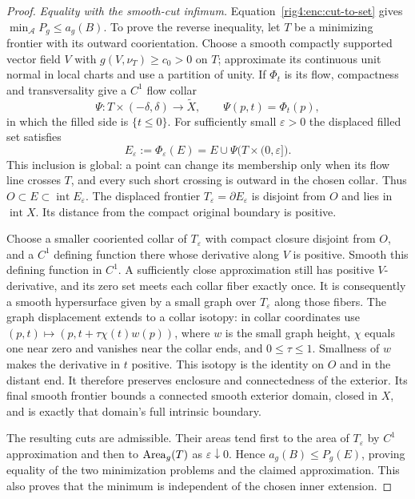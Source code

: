 \begin{proof}
\emph{Equality with the smooth-cut infimum.}
Equation~\eqref{rig4:enc:cut-to-set} gives
$\min_{\mathcal A}P_g\le a_g(B)$. To prove the reverse inequality, let
$T$ be a minimizing frontier with its outward coorientation. Choose a
smooth compactly supported vector field $V$ with
$g(V,\nu_T)\ge c_0>0$ on $T$; approximate its continuous unit normal in
local charts and use a partition of unity. If $\Phi_t$ is its flow,
compactness and transversality give a $C^1$ flow collar
\[
 \Psi:T\times(-\delta,\delta)\longrightarrow\widetilde X,
 \qquad \Psi(p,t)=\Phi_t(p),
\]
in which the filled side is $\{t\le0\}$. For sufficiently small
$\varepsilon>0$ the displaced filled set satisfies
\[
 E_\varepsilon:=\Phi_\varepsilon(E)
   =E\cup\Psi\bigl(T\times(0,\varepsilon]\bigr).
\]
This inclusion is global: a point can change its membership only when
its flow line crosses $T$, and every such short crossing is outward in
the chosen collar. Thus
$O\subset E\subset\operatorname{int}E_\varepsilon$.
The displaced frontier $T_\varepsilon=\partial E_\varepsilon$ is
disjoint from $O$ and lies in $\operatorname{int}X$. Its distance from
the compact original boundary is positive.

Choose a smaller cooriented collar of $T_\varepsilon$ with compact
closure disjoint from $O$, and a $C^1$ defining function there whose
derivative along $V$ is positive. Smooth this defining function in
$C^1$. A sufficiently close approximation still has positive
$V$-derivative, and its zero set meets each collar fiber exactly once.
It is consequently a smooth hypersurface given by a small graph over
$T_\varepsilon$ along those fibers. The graph displacement extends to
a collar isotopy: in collar coordinates use
$(p,t)\mapsto(p,t+\tau\chi(t)w(p))$, where $w$ is the small graph height,
$\chi$ equals one near zero and vanishes near the collar ends, and
$0\le\tau\le1$. Smallness of $w$ makes the derivative in $t$ positive.
This isotopy is the identity on $O$ and in the distant end. It
therefore preserves enclosure and connectedness of the exterior.
Its final smooth frontier bounds a connected smooth exterior domain,
closed in $X$, and is exactly that domain's full intrinsic boundary.

The resulting cuts are admissible. Their areas tend first to the
area of $T_\varepsilon$ by $C^1$ approximation and then to
$\operatorname{Area}_g(T)$ as $\varepsilon\downarrow0$. Hence
$a_g(B)\le P_g(E)$, proving equality of the two minimization problems
and the claimed approximation. This also proves that the minimum is
independent of the chosen inner extension.


\end{proof}
